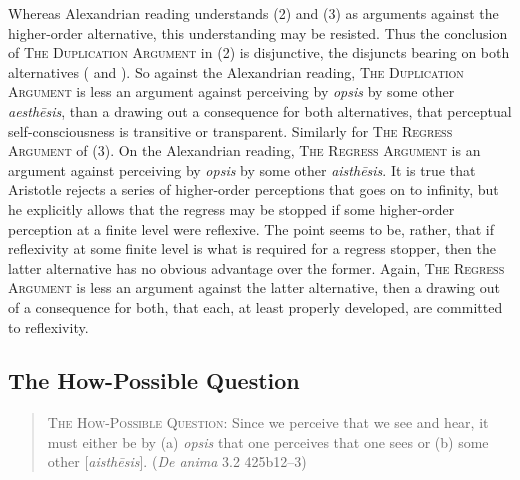 Whereas Alexandrian reading understands (2) and (3) as arguments against the higher-order alternative, this understanding may be resisted. Thus the conclusion of \textsc{The Duplication Argument} in (2) is disjunctive, the disjuncts bearing on both alternatives (\citealt[401]{Osborne:1983le} and \citealt[765 n33]{caston02}). So against the Alexandrian reading, \textsc{The Duplication Argument} is less an argument against perceiving by \emph{opsis} by some other \emph{aesthēsis}, than a drawing out a consequence for both alternatives, that perceptual self-consciousness is transitive or transparent. Similarly for \textsc{The Regress Argument} of (3). On the Alexandrian reading, \textsc{The Regress Argument} is an argument against perceiving by \emph{opsis} by some other \emph{aisthēsis}. It is true that Aristotle rejects a series of higher-order perceptions that goes on to infinity, but he explicitly allows that the regress may be stopped if some higher-order perception at a finite level were reflexive. The point seems to be, rather, that if reflexivity at some finite level is what is required for a regress stopper, then the latter alternative has no obvious advantage over the former. Again, \textsc{The Regress Argument} is less an argument against the latter alternative, then a drawing out of a consequence for both, that each, at least properly developed, are committed to reflexivity.


\subsection{The How-Possible Question} %
\label{sub:the_how_possible_question}

\begin{quote}
	\textsc{The How-Possible Question}: Since we perceive that we see and hear, it must either be by (a) \emph{opsis} that one perceives that one sees or (b) some other [\emph{aisthēsis}]. (\emph{De anima} 3.2 425b12–3)
\end{quote}

